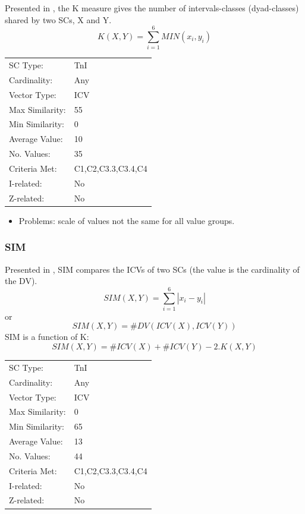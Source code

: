 \documentclass{article}
\begin{document}
Presented in \citet[pp. 448]{Morris1979}, the K measure gives the
number of intervals-classes (dyad-classes) shared by two SCs, X and Y.
$$ K(X,Y)= \sum_{i=1}^{6}{MIN(x_{i},y_{i})} $$

\begin{center}
\begin{tabular}{ll}
 SC Type:         &  TnI                 \\
 Cardinality:     &  Any                 \\
 Vector Type:     &  ICV                 \\
 Max Similarity:  &  55                  \\
 Min Similarity:  &  0                   \\
 Average Value:   &  10                  \\
 No. Values:      &  35                  \\
 Criteria Met:    &  C1,C2,C3.3,C3.4,C4  \\
 I-related:       &  No                  \\
 Z-related:       &  No                  \\
\end{tabular}
\end{center}


\begin{itemize}
\item Problems: scale of values not the same for all value groups.
\end{itemize}
\subsubsection{SIM}
\label{sec-13-1-2}

Presented in \citet[pp. 446]{Morris1979}, SIM compares the ICVs of
two SCs (the value is the cardinality of the DV).
$$SIM\left(X,Y\right)=\sum_{i=1}^{6}\left|x_{i}-y_{i}\right|$$
or
$$SIM\left(X,Y\right)=\#DV\left(ICV\left(X\right),ICV\left(Y\right)\right)$$
SIM is a function of K:
$$SIM(X,Y) = \#ICV(X) + \#ICV(Y) - 2.K(X,Y)$$

\begin{center}
\begin{tabular}{ll}
 SC Type:         &  TnI                 \\
 Cardinality:     &  Any                 \\
 Vector Type:     &  ICV                 \\
 Max Similarity:  &  0                   \\
 Min Similarity:  &  65                  \\
 Average Value:   &  13                  \\
 No. Values:      &  44                  \\
 Criteria Met:    &  C1,C2,C3.3,C3.4,C4  \\
 I-related:       &  No                  \\
 Z-related:       &  No                  \\
\end{tabular}
\end{center}
\end{document}

